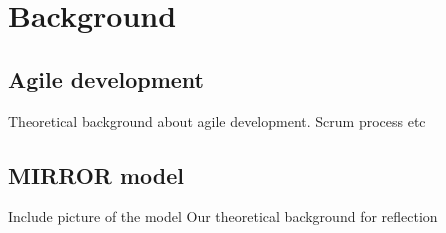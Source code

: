 \chapter{Background}

\section{Agile development}
Theoretical background about agile development. Scrum process etc

\section{MIRROR model}
Include picture of the model
Our theoretical background for reflection

